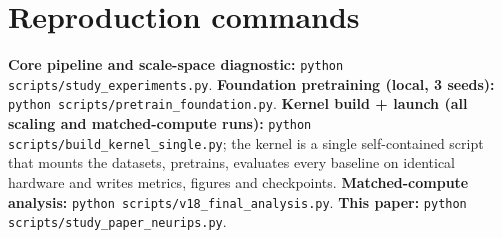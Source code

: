 \documentclass{article}
\begin{document}
\section{Reproduction commands}
\label{app:repro}
\textbf{Core pipeline and scale-space diagnostic:}
\texttt{python scripts/study\_experiments.py}.
\textbf{Foundation pretraining (local, 3 seeds):}
\texttt{python scripts/pretrain\_foundation.py}.
\textbf{Kernel build + launch (all scaling and matched-compute runs):}
\texttt{python scripts/build\_kernel\_single.py}; the kernel is a single
self-contained script that mounts the datasets, pretrains, evaluates every
baseline on identical hardware and writes metrics, figures and checkpoints.
\textbf{Matched-compute analysis:}
\texttt{python scripts/v18\_final\_analysis.py}.
\textbf{This paper:} \texttt{python scripts/study\_paper\_neurips.py}.
\end{document}
